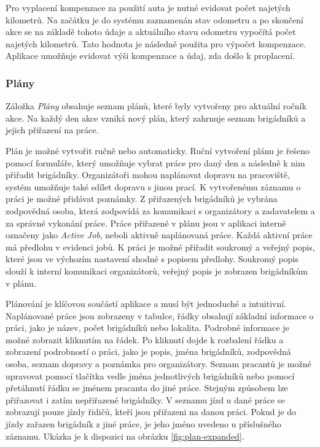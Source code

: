 Pro vyplacení kompenzace za použití auta je nutné evidovat počet najetých kilometrů. Na začátku je do systému zaznamenán stav odometru a po skončení akce
se na základě tohoto údaje a aktuálního stavu odometru vypočítá počet najetých kilometrů. Tato hodnota je následně použita pro výpočet kompenzace. Aplikace 
umožňuje evidovat výši kompenzace a údaj, zda došlo k proplacení.

\subsubsection{Plány}

Záložka \textit{Plány} obsahuje seznam plánů, které byly vytvořeny pro aktuální ročník akce. Na každý den akce vzniká nový plán, který zahrnuje
seznam brigádníků a jejich přiřazení na práce.

Plán je možné vytvořit ručně nebo automaticky. Ruční vytvoření plánu je řešeno pomocí formuláře, který umožňuje vybrat práce pro daný den a následně 
k nim přiřadit brigádníky. Organizátoři mohou naplánovat dopravu na pracoviště, systém umožňuje také sdílet dopravu s jinou prací. K vytvořenému záznamu
o práci je možné přidávat poznámky. Z přiřazených brigádníků je vybrána zodpovědná osoba, která zodpovídá za komunikaci s organizátory a zadavatelem a za správné vykonání práce.
Práce přiřazené v plánu jsou v aplikaci interně označeny jako \textit{Active Job}, neboli aktivně naplánovaná práce. Každá aktivní práce má předlohu v evidenci jobů.
K práci je možné přiřadit soukromý a veřejný popis, které jsou ve výchozím nastavení shodné s popisem předlohy. Soukromý popis slouží k interní komunikaci organizátorů,
veřejný popis je zobrazen brigádníkům v plánu.

Plánování je klíčovou součástí aplikace a musí být jednoduché a intuitivní. Naplánované práce jsou zobrazeny v tabulce, řádky obsahují
základní informace o práci, jako je název, počet brigádníků nebo lokalita. Podrobné informace je možné zobrazit kliknutím na řádek. Po kliknutí 
dojde k rozbalení řádku a zobrazení podrobností o práci, jako je popis, jména brigádníků, zodpovědná osoba, seznam dopravy a poznámka pro organizátory.
Seznam pracantů je možné upravovat pomocí tlačítka vedle jména jednotlivých brigádníků nebo pomocí přetáhnutí řádku se jménem pracanta do jiné práce.
Stejným způsobem lze přiřazovat i zatím nepřiřazené brigádníky. V seznamu jízd u dané práce se zobrazují pouze jízdy řidičů, kteří jsou přiřazeni na danou práci.
Pokud je do jízdy zařazen brigádník z jiné práce, je jeho jméno uvedeno u příslušného záznamu. Ukázka je k dispozici na obrázku \ref{fig:plan-expanded}.

